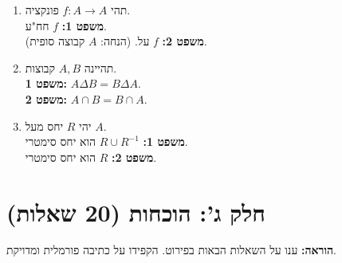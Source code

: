 \documentclass[a4paper,11pt]{article}
\begin{document}
\begin{enumerate}
    \item תהי \(f: A \to A\) פונקציה.
          \\ \textbf{משפט 1:} \(f\) חח"ע.
          \\ \textbf{משפט 2:} \(f\) על.
          (הנחה: \(A\) קבוצה סופית).

    \item תהיינה \(A, B\) קבוצות.
          \\ \textbf{משפט 1:} \(A \Delta B = B \Delta A\).
          \\ \textbf{משפט 2:} \(A \cap B = B \cap A\).

    \item יהי \(R\) יחס מעל \(A\).
          \\ \textbf{משפט 1:} \(R \cup R^{-1}\) הוא יחס סימטרי.
          \\ \textbf{משפט 2:} \(R\) הוא יחס סימטרי.

\end{enumerate}

\newpage
\section*{חלק ג': הוכחות (20 שאלות)}
\textbf{הוראה:} ענו על השאלות הבאות בפירוט. הקפידו על כתיבה פורמלית ומדויקת.
\end{document}

